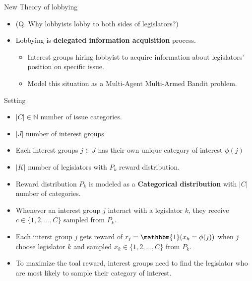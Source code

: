 \documentclass{beamer}
\begin{document}
	\begin{frame}{New Theory of lobbying}
		\fontsize{13pt}{12pt}

		\begin{itemize}
			\item (Q. Why lobbyists lobby to both sides of legislators?)
			\item Lobbying is \textbf{delegated information acquisition} process.
			\begin{itemize}
				\item Interest groups hiring lobbyist to acquire information about legislators' position on specific issue.
				\item Model this situation as a Multi-Agent Multi-Armed Bandit problem.
			\end{itemize}
		\end{itemize}
	\end{frame}

	\begin{frame}{Setting}
		\begin{itemize}
			\item $|C| \in \mathbb{N}$ number of issue categories.
			\item $|J|$ number of interest groups
			\item Each interest groups $j \in J$ has their own unique category of interest $\phi(j)$
			\item $|K|$ number of legislators with $P_k$ reward distribution.
			\item Reward distribution $P_k$ is modeled as a \textbf{Categorical distribution} 
			with $|C|$ number of categories. 
			\item Whenever an interest group $j$ interact with a legislator $k$, they receive $c \in \{1, 2, \hdots, C\}$ sampled from $P_k$.
			\item Each interst group $j$ gets reward of $r_j = \mathbbm{1}(x_k = \phi(j))$ when $j$ 
			choose legislator $k$ and sampled $x_k \in \{1, 2, \hdots, C\} $ from $P_k$. 
			\item To maximize the toal reward, interest groups need to find the 
			legislator who are most likely to sample their category of interest. 
		\end{itemize}
	\end{frame}
\end{document}
